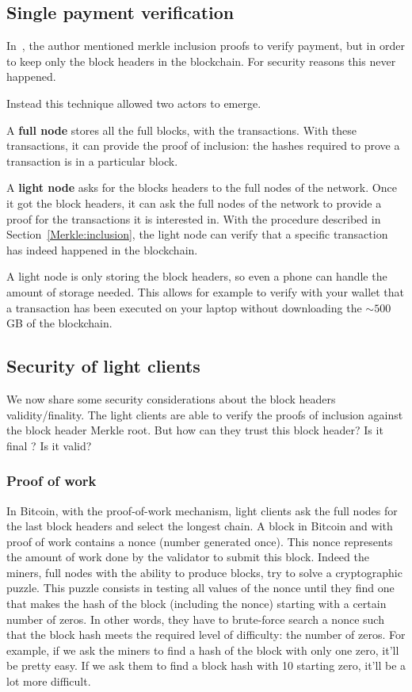 \subsection{Single payment verification}

In~\cite{Nakamoto..09}, the author mentioned merkle inclusion proofs to verify payment, but in order to keep only the block headers in the blockchain. For security reasons this never happened. 

Instead this technique allowed two actors to emerge.

A \textbf{full node} stores all the full blocks, with the transactions. With these transactions, it can provide the proof of inclusion: the hashes required to prove a transaction is in a particular block.

A \textbf{light node} asks for the blocks headers to the full nodes of the network. Once it got the block headers, it can ask the full nodes of the network to provide a proof for the transactions it is interested in. With the procedure described in Section~\ref{Merkle:inclusion}, the light node can verify that a specific transaction has indeed happened in the blockchain.

A light node is only storing the block headers, so even a phone can handle the amount of storage needed. This allows for example to verify with your wallet that a transaction has been executed  on your laptop without downloading the $\sim 500$GB of the blockchain.


\subsection{Security of light clients}
\label{background:security}
We now share some security considerations about the block headers validity/finality. The light clients are able to verify the proofs of inclusion against the block header Merkle root. But how can they trust this block header? Is it final ? Is it valid? 

\subsubsection{Proof of work}
In Bitcoin, with the proof-of-work mechanism, light clients ask the full nodes for the last block headers and select the longest chain. 
A block in Bitcoin and with proof of work contains a nonce (number generated once). This nonce represents the amount of work done by the validator to submit this block. 
Indeed the miners, full nodes with the ability to produce blocks, try to solve a cryptographic puzzle. This puzzle consists in testing all values of the nonce until they find one that makes the hash of the block (including the nonce) starting with a certain number of zeros. 
In other words, they have to brute-force search a nonce such that the block hash meets the required level of difficulty: the number of zeros. 
For example, if we ask the miners to find a hash of the block with only one zero, it'll be pretty easy. If we ask them to find a block hash with 10 starting zero, it'll be a lot more difficult. 

